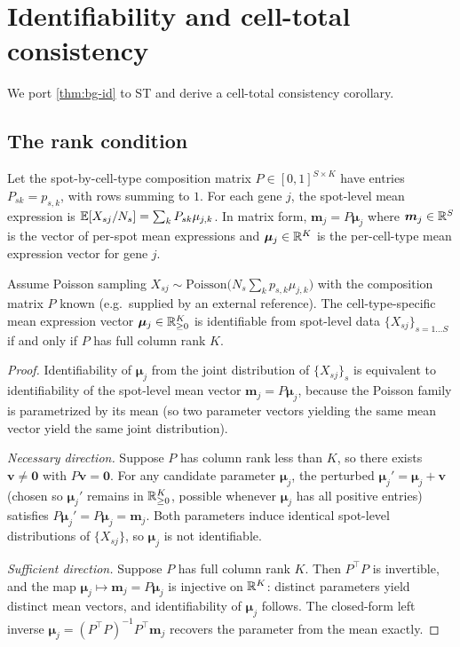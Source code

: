 \section{Identifiability and cell-total consistency}
\label{sec:identifiability}

We port \cref{thm:bg-id} to ST and derive a cell-total consistency
corollary.

\subsection{The rank condition}

Let the spot-by-cell-type composition matrix $P \in [0,1]^{S \times K}$
have entries $P_{sk} = p_{s,k}$, with rows summing to $1$. For each
gene $j$, the spot-level mean expression is $\mathbb{E}[X_{sj}/N_s] = \sum_k
P_{sk} \mu_{j,k}$. In matrix form, $\bm{m}_j = P \bm{\mu}_j$ where
$\bm{m}_j \in \mathbb{R}^S$ is the vector of per-spot mean expressions and
$\bm{\mu}_j \in \mathbb{R}^K$ is the per-cell-type mean expression vector
for gene $j$.

\begin{theorem}
\label{thm:rank}
Assume Poisson sampling $X_{sj} \sim
\mathrm{Poisson}\bigl(N_s \sum_k p_{s,k} \mu_{j,k}\bigr)$ with the
composition matrix $P$ known (e.g.\ supplied by an external
reference). The cell-type-specific mean expression vector
$\bm{\mu}_j \in \mathbb{R}_{\geq 0}^K$ is identifiable from spot-level data
$\{X_{sj}\}_{s=1\ldots S}$ if and only if $P$ has full column rank
$K$.
\end{theorem}

\begin{proof}
Identifiability of $\bm{\mu}_j$ from the joint distribution of
$\{X_{sj}\}_s$ is equivalent to identifiability of the spot-level
mean vector $\bm{m}_j = P\bm{\mu}_j$, because the Poisson family
is parametrized by its mean (so two parameter vectors yielding the
same mean vector yield the same joint distribution).

\emph{Necessary direction.} Suppose $P$ has column rank less than
$K$, so there exists $\bm{v} \neq \bm{0}$ with $P\bm{v} = \bm{0}$.
For any candidate parameter $\bm{\mu}_j$, the perturbed
$\bm{\mu}_j' = \bm{\mu}_j + \bm{v}$ (chosen so $\bm{\mu}_j'$ remains
in $\mathbb{R}_{\geq 0}^K$, possible whenever $\bm{\mu}_j$ has all positive
entries) satisfies $P\bm{\mu}_j' = P\bm{\mu}_j = \bm{m}_j$. Both
parameters induce identical spot-level distributions of $\{X_{sj}\}$,
so $\bm{\mu}_j$ is not identifiable.

\emph{Sufficient direction.} Suppose $P$ has full column rank $K$.
Then $P^\top P$ is invertible, and the map $\bm{\mu}_j \mapsto
\bm{m}_j = P\bm{\mu}_j$ is injective on $\mathbb{R}^K$: distinct parameters
yield distinct mean vectors, and identifiability of $\bm{\mu}_j$
follows. The closed-form left inverse
$\bm{\mu}_j = (P^\top P)^{-1} P^\top \bm{m}_j$ recovers the
parameter from the mean exactly.
\end{proof}

